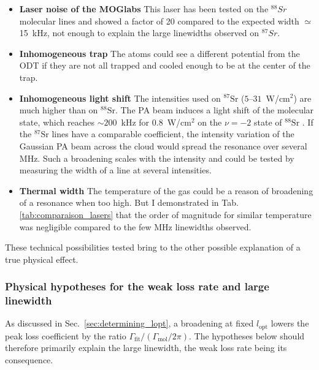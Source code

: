\begin{itemize}
        This possibility has been ruled out by tests on $^{88}\text{Sr}$ and $^{87}\text{Sr}$ molecular lines, which did not change in the presence of the chopping. 
    \item \textbf{Laser noise of the MOGlabs} This laser has been tested on the $^{88}Sr$ molecular lines and showed a factor of 20 compared to the expected width $\simeq$15~kHz, not enough to explain the large linewidths observed on $^{87}Sr$.
    \item \textbf{Inhomogeneous trap} The atoms could see a different potential from the ODT if they are not all trapped and cooled enough to be at the center of the trap. 
    \item \textbf{Inhomogeneous light shift} The intensities used on $^{87}\text{Sr}$ ($5$--$31$~W/cm$^2$) are much higher than on $^{88}\text{Sr}$. The PA beam induces a light shift of the molecular state, which reaches $\sim 200$~kHz for $0.8$~W/cm$^2$ on the $\nu=-2$ state of $^{88}\text{Sr}$ \cite{blatt_measurement_2011}. If the $^{87}\text{Sr}$ lines have a comparable coefficient, the intensity variation of the Gaussian PA beam across the cloud would spread the resonance over several MHz. Such a broadening scales with the intensity and could be tested by measuring the width of a line at several intensities.
    \item \textbf{Thermal width} The temperature of the gas could be a reason of broadening of a resonance when too high. But I demonstrated in Tab.\ref{tab:comparaison_lasers} that the order of magnitude for similar temperature was negligible compared
    to the few MHz linewidths observed.
\end{itemize}

These technical possibilities tested bring to the other possible explanation of a true physical effect.

\subsubsection{Physical hypotheses for the weak loss rate and large linewidth}
\label{sec:physical_hypotheses}
As discussed in Sec.~\ref{sec:determining_lopt}, a broadening at fixed $l_{\text{opt}}$ lowers the peak loss coefficient by the ratio $\Gamma_{\text{fit}}/(\Gamma_{\text{mol}}/2\pi)$. The hypotheses below should therefore primarily explain the large linewidth, the weak loss rate being its consequence.

